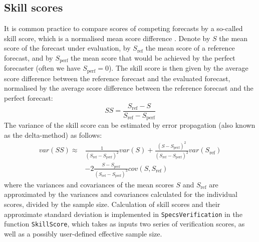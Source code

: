 \documentclass[10pt]{article}\usepackage[]{graphicx}\usepackage[]{color}
\newcommand{\pkg}[1]{\texttt{#1}}
\newcommand{\code}[1]{\texttt{#1}}
\begin{document}
\subsection{Skill scores}

It is common practice to compare scores of competing forecasts by a so-called skill score, which is a normalised mean score difference \citep{wilks2011statistical}.
Denote by $S$ the mean score of the forecast under evaluation, by $S_{\text{ref}}$ the mean score of a reference forecast, and by $S_{\text{perf}}$ the mean score that would be achieved by the perfect forecaster (often we have $S_{\text{perf}}=0$).
The skill score is then given by the average score difference between the reference forecast and the evaluated forecast, normalised by the average score difference between the reference forecast and the perfect forecast:
%
\begin{equation}
SS = \frac{S_{\text{ref}} - S}{S_{\text{ref}} - S_{\text{perf}}}
\end{equation}
%
The variance of the skill score can be estimated by error propagation (also known as the delta-method) as follows:
%
\begin{align}
var(SS) \approx & \frac{1}{(S_{\text{ref}} - S_{\text{perf}})^2} var(S) + \frac{(S - S_{\text{perf}})^2}{(S_{\text{ref}}-S_{\text{perf}})^2} var(S_{\text{ref}})\nonumber\\
& - 2 \frac{S-S_{\text{perf}}}{(S_{\text{ref}}-S_{\text{perf}})^3} cov(S, S_{\text{ref}})
\end{align}
%
where the variances and covariances of the mean scores $S$ and $S_{\text{ref}}$ are approximated by the variances and covariances calculated for the individual scores, divided by the sample size.
Calculation of skill scores and their approximate standard deviation is implemented in \pkg{SpecsVerification} in the function \code{SkillScore}, which takes as inputs two series of verification scores, as well as a possibly user-defined effective sample size.
\end{document}
